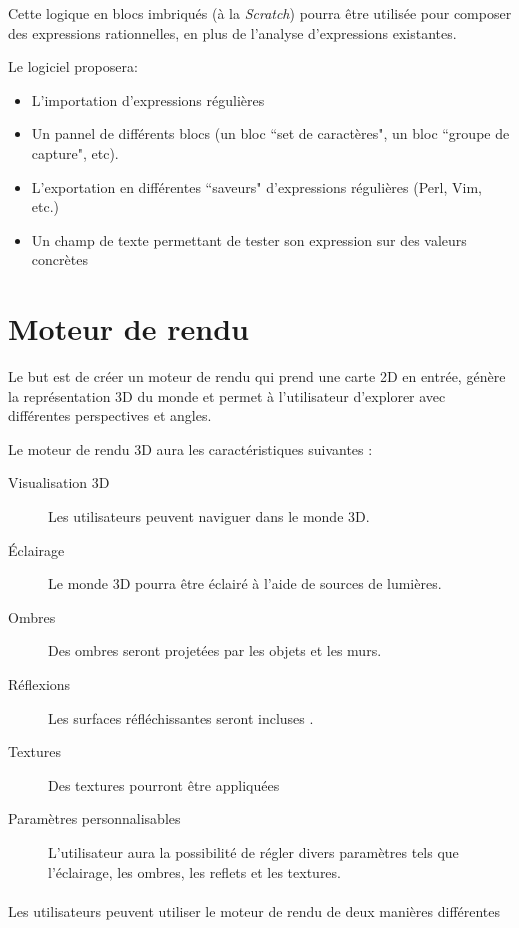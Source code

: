 \documentclass{article}
\begin{document}
Cette logique en blocs imbriqués (à la \emph{Scratch}) pourra être utilisée pour composer des expressions rationnelles, en plus de l'analyse d'expressions existantes.

Le logiciel proposera:

\begin{itemize}
    \item L'importation d'expressions régulières
    \item Un pannel de différents blocs (un bloc ``set de caractères", un bloc ``groupe de capture", etc).
    \item L'exportation en différentes ``saveurs" d'expressions régulières (Perl, Vim, etc.) 
    \item Un champ de texte permettant de tester son expression sur des valeurs concrètes
\end{itemize}

\section{Moteur de rendu}
Le but est de créer un moteur de rendu qui prend une carte 2D en entrée, génère la représentation 3D du monde et permet à l'utilisateur  d'explorer avec différentes perspectives et angles.

Le moteur de rendu 3D aura les caractéristiques suivantes :

\begin{description}
    \item[Visualisation 3D]  Les utilisateurs peuvent naviguer dans le monde 3D.
    \item[Éclairage] Le monde 3D pourra être éclairé à l'aide de sources de lumières.
    \item[Ombres] Des ombres seront projetées par les objets et les murs.
    \item[Réflexions] Les surfaces réfléchissantes seront incluses .
    \item[Textures] Des textures pourront être appliquées
    \item[Paramètres personnalisables] L'utilisateur aura la possibilité de régler divers paramètres tels que l'éclairage, les ombres, les reflets et les textures.
\end{description}

\paragraph{}
Les utilisateurs peuvent utiliser le moteur de rendu de deux manières différentes
\end{document}
